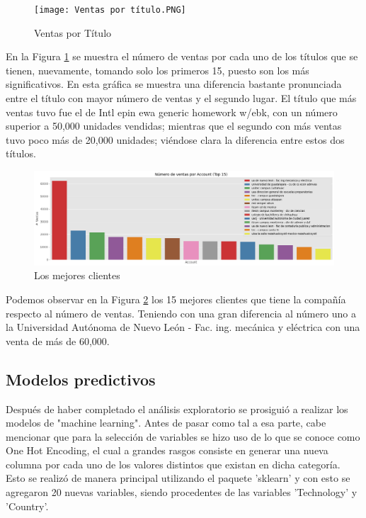 \documentclass{article}
\begin{document}
        \begin{figure}[h!]
            \centering
            \texttt{[image: Ventas por título.PNG]}
            \caption{Ventas por Título}
            \label{fig:ventTítulo}
        \end{figure}

        En la Figura \ref{fig:ventTítulo} se muestra el número de ventas por cada uno de los títulos que se tienen, nuevamente, tomando solo los primeros 15, puesto son los más significativos. En esta gráfica se muestra una diferencia bastante pronunciada entre el título con mayor número de ventas y el segundo lugar. El título que más ventas tuvo fue el de Intl epin ewa generic homework w/ebk, con un número superior a 50,000 unidades vendidas; mientras que el segundo con más ventas tuvo poco más de 20,000 unidades; viéndose clara la diferencia entre estos dos títulos.

        \begin{figure}[h!]
            \centering
            \includegraphics[width = \columnwidth]{VentasVSAccount.png}
            \caption{Los mejores clientes}
            \label{fig:ventClientes}
        \end{figure}

        Podemos observar en la Figura \ref{fig:ventClientes} los 15 mejores clientes que tiene la compañía respecto al número de ventas. Teniendo con una gran diferencia al número uno a la Universidad Autónoma de Nuevo León - Fac. ing. mecánica y eléctrica con una venta de más de 60,000.

        \newpage

        \subsection{Modelos predictivos}

        Después de haber completado el análisis exploratorio se prosiguió a realizar los modelos de "machine learning". Antes de pasar como tal a esa parte, cabe mencionar que para la selección de variables se hizo uso de lo que se conoce como One Hot Encoding, el cual a grandes rasgos consiste en generar una nueva columna por cada uno de los valores distintos que existan en dicha categoría. Esto se realizó de manera principal utilizando el paquete 'sklearn' y con esto se agregaron 20 nuevas variables, siendo procedentes de las variables 'Technology' y 'Country'.
\end{document}
